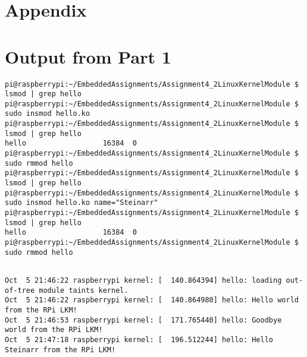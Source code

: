 \documentclass{article}
\begin{document}
\section*{Appendix}
\appendix
\section{Output from Part 1}
\begin{lstlisting}[caption={src/hello.cpp, writes "Hello" to stdout}]
pi@raspberrypi:~/EmbeddedAssignments/Assignment4_2LinuxKernelModule $ lsmod | grep hello
pi@raspberrypi:~/EmbeddedAssignments/Assignment4_2LinuxKernelModule $ sudo insmod hello.ko
pi@raspberrypi:~/EmbeddedAssignments/Assignment4_2LinuxKernelModule $ lsmod | grep hello
hello                  16384  0
pi@raspberrypi:~/EmbeddedAssignments/Assignment4_2LinuxKernelModule $ sudo rmmod hello
pi@raspberrypi:~/EmbeddedAssignments/Assignment4_2LinuxKernelModule $ lsmod | grep hello
pi@raspberrypi:~/EmbeddedAssignments/Assignment4_2LinuxKernelModule $ sudo insmod hello.ko name="Steinarr"
pi@raspberrypi:~/EmbeddedAssignments/Assignment4_2LinuxKernelModule $ lsmod | grep hello
hello                  16384  0
pi@raspberrypi:~/EmbeddedAssignments/Assignment4_2LinuxKernelModule $ sudo rmmod hello
\end{lstlisting}

\begin{lstlisting}

Oct  5 21:46:22 raspberrypi kernel: [  140.864394] hello: loading out-of-tree module taints kernel.
Oct  5 21:46:22 raspberrypi kernel: [  140.864980] hello: Hello world from the RPi LKM!
Oct  5 21:46:53 raspberrypi kernel: [  171.765440] hello: Goodbye world from the RPi LKM!
Oct  5 21:47:18 raspberrypi kernel: [  196.512244] hello: Hello Steinarr from the RPi LKM!
\end{lstlisting}
\end{document}
